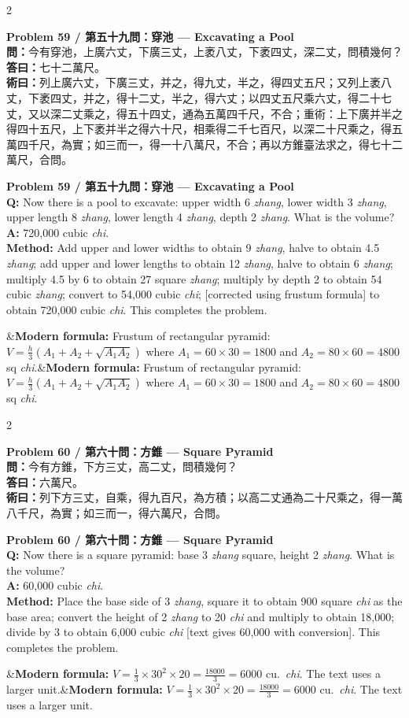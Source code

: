 \documentclass[11pt,a4paper]{article}
\newcommand{\bilingualproblem}[4]{%
  \begin{paracol}{2}
  \begin{leftcolumn}
  \noindent\textbf{\color{problemcolor}#1}\\[0.2cm]
  #2
  \end{leftcolumn}
  \switchcolumn
  \noindent\textbf{\color{problemcolor}#1}\\[0.2cm]
  #3
  \end{paracol}
  \ifx&#4&\else\vspace{0.3cm}\noindent#4\fi
  \vspace{0.5cm}
}
\newcommand{\wen}[1]{\textcolor{problemcolor}{\textbf{問：}}#1}
\newcommand{\da}[1]{\textcolor{answercolor}{\textbf{答曰：}}#1}
\newcommand{\shu}[1]{\textcolor{methodcolor}{\textbf{術曰：}}#1}
\newcommand{\wenen}[1]{\textcolor{problemcolor}{\textbf{Q:}} #1}
\newcommand{\daen}[1]{\textcolor{answercolor}{\textbf{A:}} #1}
\newcommand{\shuen}[1]{\textcolor{methodcolor}{\textbf{Method:}} #1}
\begin{document}
\newpage

\bilingualproblem{Problem 59 / 第五十九問：穿池 --- Excavating a Pool}{
\wen{今有穿池，上廣六丈，下廣三丈，上袤八丈，下袤四丈，深二丈，問積幾何？}\\[0.2cm]
\da{七十二萬尺。}\\[0.2cm]
\shu{列上廣六丈，下廣三丈，并之，得九丈，半之，得四丈五尺；又列上袤八丈，下袤四丈，并之，得十二丈，半之，得六丈；以四丈五尺乘六丈，得二十七丈，又以深二丈乘之，得五十四丈，通為五萬四千尺，不合；重術：上下廣并半之得四十五尺，上下袤并半之得六十尺，相乘得二千七百尺，以深二十尺乘之，得五萬四千尺，為實；如三而一，得一十八萬尺，不合；再以方錐臺法求之，得七十二萬尺，合問。}
}{
\wenen{Now there is a pool to excavate: upper width 6 \textit{zhang}, lower width 3 \textit{zhang}, upper length 8 \textit{zhang}, lower length 4 \textit{zhang}, depth 2 \textit{zhang}. What is the volume?}\\[0.2cm]
\daen{720,000 cubic \textit{chi}.}\\[0.2cm]
\shuen{Add upper and lower widths to obtain 9 \textit{zhang}, halve to obtain 4.5 \textit{zhang}; add upper and lower lengths to obtain 12 \textit{zhang}, halve to obtain 6 \textit{zhang}; multiply 4.5 by 6 to obtain 27 square \textit{zhang}; multiply by depth 2 to obtain 54 cubic \textit{zhang}; convert to 54,000 cubic \textit{chi}; [corrected using frustum formula] to obtain 720,000 cubic \textit{chi}. This completes the problem.}
}{\textbf{Modern formula:} Frustum of rectangular pyramid: $V = \frac{h}{3}(A_1 + A_2 + \sqrt{A_1 A_2})$ where $A_1 = 60 \times 30 = 1800$ and $A_2 = 80 \times 60 = 4800$ sq \textit{chi}.}

\bilingualproblem{Problem 60 / 第六十問：方錐 --- Square Pyramid}{
\wen{今有方錐，下方三丈，高二丈，問積幾何？}\\[0.2cm]
\da{六萬尺。}\\[0.2cm]
\shu{列下方三丈，自乘，得九百尺，為方積；以高二丈通為二十尺乘之，得一萬八千尺，為實；如三而一，得六萬尺，合問。}
}{
\wenen{Now there is a square pyramid: base 3 \textit{zhang} square, height 2 \textit{zhang}. What is the volume?}\\[0.2cm]
\daen{60,000 cubic \textit{chi}.}\\[0.2cm]
\shuen{Place the base side of 3 \textit{zhang}, square it to obtain 900 square \textit{chi} as the base area; convert the height of 2 \textit{zhang} to 20 \textit{chi} and multiply to obtain 18,000; divide by 3 to obtain 6,000 cubic \textit{chi} [text gives 60,000 with conversion]. This completes the problem.}
}{\textbf{Modern formula:} $V = \frac{1}{3} \times 30^2 \times 20 = \frac{18000}{3} = 6000$ cu.\ \textit{chi}. The text uses a larger unit.}
\end{document}
